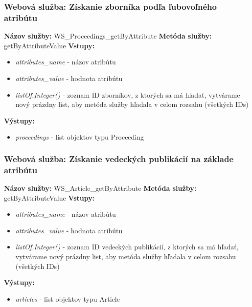 \documentclass[10pt,oneside,slovak,a4paper]{article}
\begin{document}
\subsubsection{Webová služba: Získanie zborníka podľa ľubovoľného atribútu}
\textbf{Názov služby:} WS\_Proceedings\_getByAttribute
\textbf{Metóda služby:} getByAttributeValue
\textbf{Vstupy:}
	\begin{itemize}
		\item \textit{attributes\_name} - názov atribútu
		\item \textit{attributes\_value} - hodnota atribútu
		\item \textit{listOf.Integer()} - zoznam ID zborníkov, z ktorých sa má hľadať, vytvárame nový prázdny list, aby metóda služby hľadala v celom rozsahu (všetkých IDs)
	\end{itemize}
\textbf{Výstupy:}
	\begin{itemize}
		\item \textit{proceedings} - list objektov typu Proceeding
	\end{itemize}
	
\subsubsection{Webová služba: Získanie vedeckých publikácií na základe atribútu}
\textbf{Názov služby:} WS\_Article\_getByAttribute
\textbf{Metóda služby:} getByAttributeValue
\textbf{Vstupy:}
	\begin{itemize}
		\item \textit{attributes\_name} - názov atribútu
		\item \textit{attributes\_value} - hodnota atribútu
		\item \textit{listOf.Integer()} - zoznam ID vedeckých publikácií, z ktorých sa má hľadať, vytvárame nový prázdny list, aby metóda služby hľadala v celom rozsahu (všetkých IDs)
	\end{itemize}
\textbf{Výstupy:}
	\begin{itemize}
		\item \textit{articles} - list objektov typu Article
	\end{itemize}
	
\end{document}

